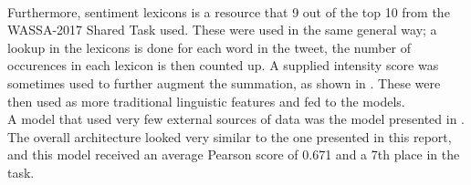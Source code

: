 \\
Furthermore, sentiment lexicons is a resource that 9 out of the top 10 from the WASSA-2017 Shared Task used. These were used in the same general way; a lookup in the lexicons is done for each word in the tweet, the number of occurences in each lexicon is then counted up. A supplied intensity score was sometimes used to further augment the summation, as shown in \cite{seernet}. These were then used as more traditional linguistic features and fed to the models.\\
A model that used very few external sources of data was the model presented in \cite{hpcc}. The overall architecture looked very similar to the one presented in this report, and this model received an average Pearson score of 0.671 and a 7th place in the task.